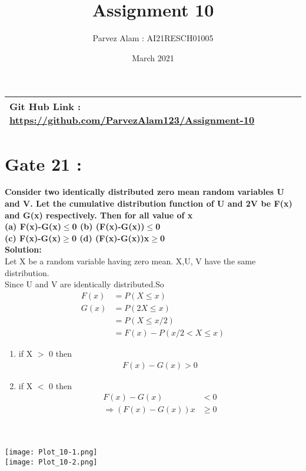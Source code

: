 \documentclass{article}
\title{Assignment 10}
\author{Parvez Alam : AI21RESCH01005 }
\date{March 2021}
\begin{document}
\maketitle
\begin{multicols}{2}
\begin{center}
    \begin{tabular}{|p{5cm}|}
    \hline
         Git Hub Link : \url{https://github.com/ParvezAlam123/Assignment-10} \\
    \hline
    \end{tabular}
\end{center}


\section{Gate 21 :}
\textbf{Consider two identically distributed zero mean random variables U and V. Let the cumulative distribution function of U and 2V be F(x) and G(x) respectively. Then for all value of x  \\
(a) F(x)-G(x)\(\leq\)0  (b) (F(x)-G(x))\(\leq\)0 \\
(c) F(x)-G(x)\(\geq\)0  (d) (F(x)-G(x))x\(\geq\)0} \\
\textbf{Solution: } \\
Let X be a random variable having zero mean. X,U, V have the same distribution. \\
Since U and V are identically distributed.So
\begin{align}
    F(x) &= P(X\leq x) \nonumber \\
    G(x) &= P(2X\leq x) \nonumber \\
         &= P(X \leq x/2) \nonumber \\
         &=F(x)-P(x/2<X\leq x) \nonumber
\end{align}
\begin{enumerate}
    \item if X \(>\) 0 then
\begin{align}
    F(x)-G(x)>0 \nonumber
\end{align}
     \item if X \(<\) 0 then
\begin{align}
    F(x)-G(x)&<0 \nonumber \\
    \Rightarrow (F(x)-G(x))x& \geq 0 \nonumber 
\end{align}
\end{enumerate}
\\ \\
\texttt{[image: Plot\_10-1.png]} \\
\texttt{[image: Plot\_10-2.png]}



\end{multicols}
\end{document}
